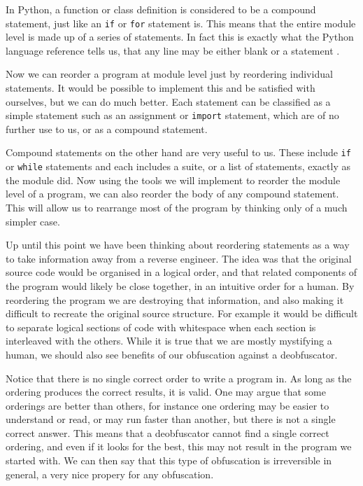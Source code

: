 \documentclass[twoside,a4paper]{report}
\begin{document}
In Python, a function or class definition is considered to be a compound statement, just like an \texttt{if} or \texttt{for} statement is. This
means that the entire module level is made up of a series of statements. In fact this is exactly what the Python language reference tells us, that
any line may be either blank or a statement \cite{fileformat}.

Now we can reorder a program at module level just by reordering individual statements. It would be possible to implement this and be satisfied with
ourselves, but we can do much better. Each statement can be classified as a simple statement such as an assignment or \texttt{import} statement,
which are of no further use to us, or as a compound statement.

Compound statements on the other hand are very useful to us. These include \texttt{if} or \texttt{while} statements and each includes a suite, or
a list of statements, exactly as the module did. Now using the tools we will implement to reorder the module level of a program, we can also reorder
the body of any compound statement. This will allow us to rearrange most of the program by thinking only of a much simpler case.

Up until this point we have been thinking about reordering statements as a way to take information away from a reverse engineer. The idea was that
the original source code would be organised in a logical order, and that related components of the program would likely be close together, in an intuitive
order for a human. By reordering the program we are destroying that information, and also making it difficult to recreate the original source structure. For
example it would be difficult to separate logical sections of code with whitespace when each section is interleaved with the others. While it is true that we
are mostly mystifying a human, we should also see benefits of our obfuscation against a deobfuscator.

Notice that there is no single correct order to write a program in. As long as the ordering produces the correct results, it is valid. One may argue that
some orderings are better than others, for instance one ordering may be easier to understand or read, or may run faster than another, but there is not
a single correct answer. This means that a deobfuscator cannot find a single correct ordering, and even if it looks for the best, this may not result in
the program we started with. We can then say that this type of obfuscation is irreversible in general, a very nice propery for any obfuscation. 
\end{document}
